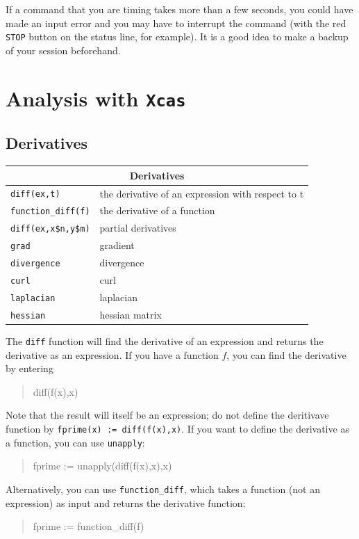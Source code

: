 \documentclass{article}
\newcommand{\xcasin}[1]
{\begin{quote}\ttfamily
#1
\end{quote}}
\begin{document}
If a command that you are timing takes more than a few seconds, you
could have made an input error and you may have to interrupt the
command (with the red \texttt{STOP} button on the status line, for
example).  It is a good idea to make a backup of your session beforehand.

\section{Analysis with \texttt{Xcas}}

\subsection{Derivatives}
\label{deriv}

\begin{center}
\begin{tabular}{|p{}|p{}|}
\hline
\multicolumn{2}{|c|}{\textbf{Derivatives}}\\
\hline\hline
\texttt{diff(ex,t)} & the derivative of an expression with respect to t\\
\texttt{function\_diff(f)} & the derivative of a function\\
\texttt{diff(ex,x\$n,y\$m)} & partial derivatives\\
\texttt{grad} & gradient\\ 
\texttt{divergence} & divergence\\
\texttt{curl} & curl\\
\texttt{laplacian} & laplacian\\
\texttt{hessian} & hessian matrix\\
\hline
\end{tabular}
\end{center}

The \texttt{diff} function will find the derivative of an expression
and returns the derivative as an expression.  If you have a function
$f$, you can find the derivative by entering
\xcasin{diff(f(x),x)}
Note that the result will itself be an expression; do not define the
deritivave function by \texttt{fprime(x) := diff(f(x),x)}.  If you
want to define the derivative as a function, you can use
\texttt{unapply}:
\xcasin{fprime := unapply(diff(f(x),x),x)}
Alternatively, you can use \texttt{function\_diff}, which takes a
function (not an expression) as input and returns the derivative
function;
\xcasin{fprime := function\_diff(f)}
\end{document}
